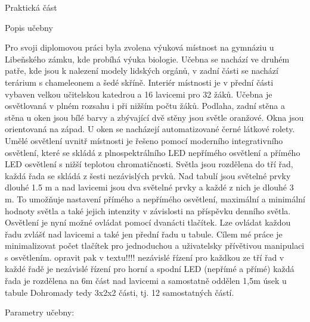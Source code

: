 \chap Praktická část

\sec Popis učebny

Pro svoji diplomovou práci byla zvolena výuková místnost na gymnáziu u Libeňského zámku, kde probíhá výuka biologie. Učebna se nachází ve druhém patře, kde jsou k nalezení modely lidských orgánů, v zadní části se nachází terárium s chameleonem a šedé skříně. Interiér místnosti je v přední části vybaven velkou učitelskou katedrou a 16 lavicemi pro 32 žáků. Učebna je osvětlovaná v plném rozsahu i při nižším počtu žáků. Podlaha, zadní stěna a stěna u oken jsou bílé barvy a zbývající dvě stěny jsou světle oranžové. Okna jsou orientovaná na západ. U oken se nacházejí automatizované černé látkové rolety.
\medskip
Umělé osvětlení uvnitř místnosti je řešeno pomocí moderního integrativního osvětlení, které se skládá z plnospektrálního LED nepřímého osvětlení a přímého LED osvětlení s nižší teplotou chromatičnosti.
Světla jsou rozdělena do tří řad, každá řada se skládá z šesti nezávislých prvků. Nad tabulí jsou světelné prvky dlouhé 1.5 m a nad lavicemi jsou dva světelné prvky a každé z nich je dlouhé 3 m. To umožňuje nastavení přímého a nepřímého osvětlení, maximální a minimální hodnoty světla a také jejich intenzity v závislosti na příspěvku denního světla. Osvětlení je nyní možné ovládat pomocí dvanácti tlačítek. Lze ovládat každou řadu zvlášť nad lavicemi a také jen přední řadu u tabule. Cílem mé práce je minimalizovat počet tlačítek pro jednoduchou a uživatelsky přívětivou manipulaci s osvětlením.
\medskip
opravit pak v textu!!!!
nezávislé řízení pro každkou ze tří řad
\medskip
v každé řadě je nezávislé řízení pro horní a spodní LED (nepřímé a přímé)
\medskip
každá řada je rozdělena na 6m část nad lavicemi a samostatně oddělen 1,5m úsek u tabule
\medskip
Dohromady tedy 3x2x2 části, tj. 12 samostatných částí.



\medskip
{\sbf Parametry učebny:}
\medskip


